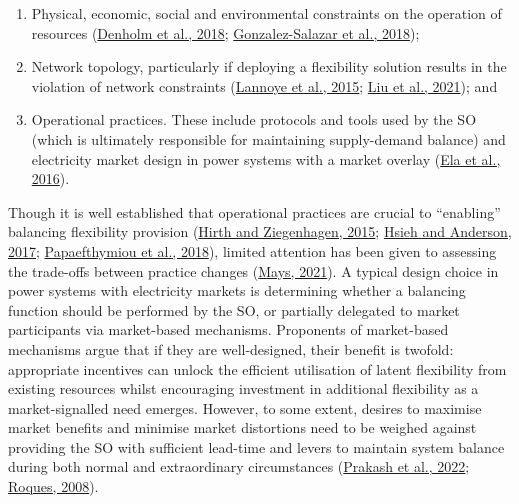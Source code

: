 \documentclass[12pt,a4paper,]{report}
\providecommand{\tightlist}{%
  \setlength{\itemsep}{0pt}\setlength{\parskip}{0pt}}
\begin{document}
\begin{enumerate}
\def\labelenumi{\arabic{enumi}.}
\tightlist
\item
  Physical, economic, social and environmental constraints on the
  operation of resources
  (\protect\hyperlink{ref-denholmHowLowCan2018}{Denholm et al., 2018};
  \protect\hyperlink{ref-gonzalez-salazarReviewOperationalFlexibility2018}{Gonzalez-Salazar
  et al., 2018});
\item
  Network topology, particularly if deploying a flexibility solution
  results in the violation of network constraints
  (\protect\hyperlink{ref-lannoyeTransmissionVariableGeneration2015}{Lannoye
  et al., 2015}; \protect\hyperlink{ref-liuGridMarketServices2021}{Liu
  et al., 2021}); and
\item
  Operational practices. These include protocols and tools used by the
  SO (which is ultimately responsible for maintaining supply-demand
  balance) and electricity market design in power systems with a market
  overlay (\protect\hyperlink{ref-elaWholesaleElectricityMarket2016}{Ela
  et al., 2016}).
\end{enumerate}

Though it is well established that operational practices are crucial to
``enabling'' balancing flexibility provision
(\protect\hyperlink{ref-hirthBalancingPowerVariable2015}{Hirth and
Ziegenhagen, 2015};
\protect\hyperlink{ref-hsiehGridFlexibilityQuiet2017}{Hsieh and
Anderson, 2017};
\protect\hyperlink{ref-papaefthymiouPowerSystemFlexibility2018}{Papaefthymiou
et al., 2018}), limited attention has been given to assessing the
trade-offs between practice changes
(\protect\hyperlink{ref-maysMissingIncentivesFlexibility2021}{Mays,
2021}). A typical design choice in power systems with electricity
markets is determining whether a balancing function should be performed
by the SO, or partially delegated to market participants via
market-based mechanisms. Proponents of market-based mechanisms argue
that if they are well-designed, their benefit is twofold: appropriate
incentives can unlock the efficient utilisation of latent flexibility
from existing resources whilst encouraging investment in additional
flexibility as a market-signalled need emerges. However, to some extent,
desires to maximise market benefits and minimise market distortions need
to be weighed against providing the SO with sufficient lead-time and
levers to maintain system balance during both normal and extraordinary
circumstances
(\protect\hyperlink{ref-prakashInsightsDesigningEffective2022}{Prakash
et al., 2022};
\protect\hyperlink{ref-roquesMarketDesignGeneration2008}{Roques, 2008}).
\end{document}

